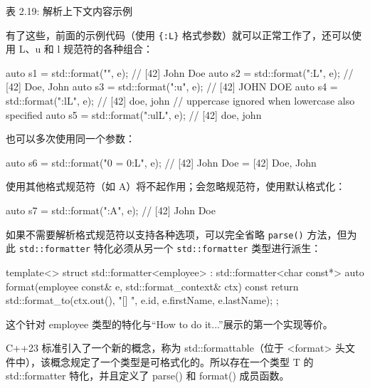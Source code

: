 \begin{center}
表 2.19: 解析上下文内容示例
\end{center}

有了这些，前面的示例代码（使用 \verb|{:L}| 格式参数）就可以正常工作了，还可以使用 L、u 和 l 规范符的各种组合：

\begin{cpp}
auto s1 = std::format("{}", e);     // [42] John Doe
auto s2 = std::format("{:L}", e);   // [42] Doe, John
auto s3 = std::format("{:u}", e);   // [42] JOHN DOE
auto s4 = std::format("{:lL}", e);  // [42] doe, john
// uppercase ignored when lowercase also specified
auto s5 = std::format("{:ulL}", e); // [42] doe, john
\end{cpp}

也可以多次使用同一个参数：

\begin{cpp}
auto s6 = std::format("{0} = {0:L}", e);
// [42] John Doe = [42] Doe, John
\end{cpp}

使用其他格式规范符（如 A）将不起作用；会忽略规范符，使用默认格式化：

\begin{cpp}
auto s7 = std::format("{:A}", e);   // [42] John Doe
\end{cpp}

如果不需要解析格式规范符以支持各种选项，可以完全省略 \verb|parse()| 方法，但为此 \verb|std::formatter| 特化必须从另一个 \verb|std::formatter| 类型进行派生：

\begin{cpp}
template<>
struct std::formatter<employee> : std::formatter<char const*>
{
    auto format(employee const& e, std::format_context& ctx) const
    {
        return std::format_to(ctx.out(), "[{}] {} {}",
        e.id, e.firstName, e.lastName);
    }
};
\end{cpp}

这个针对 employee 类型的特化与“How to do it...”展示的第一个实现等价。


C++23 标准引入了一个新的概念，称为 std::formattable（位于 <format> 头文件中），该概念规定了一个类型是可格式化的。所以存在一个类型 T 的 std::formatter 特化，并且定义了 parse() 和 format() 成员函数。

